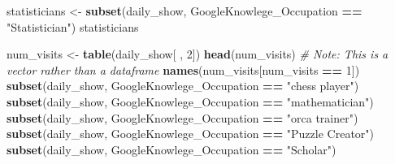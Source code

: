 \documentclass[]{book}
\makeatletter
\newenvironment{Shaded}{\begin{snugshade}}{\end{snugshade}}
\newcommand{\KeywordTok}[1]{\textcolor[rgb]{0.13,0.29,0.53}{\textbf{#1}}}
\newcommand{\DataTypeTok}[1]{\textcolor[rgb]{0.13,0.29,0.53}{#1}}
\newcommand{\DecValTok}[1]{\textcolor[rgb]{0.00,0.00,0.81}{#1}}
\newcommand{\StringTok}[1]{\textcolor[rgb]{0.31,0.60,0.02}{#1}}
\newcommand{\CommentTok}[1]{\textcolor[rgb]{0.56,0.35,0.01}{\textit{#1}}}
\newcommand{\OperatorTok}[1]{\textcolor[rgb]{0.81,0.36,0.00}{\textbf{#1}}}
\newcommand{\NormalTok}[1]{#1}
\newenvironment{kframe}{%
\medskip{}
\setlength{\fboxsep}{.8em}
 \def\at@end@of@kframe{}%
 \ifinner\ifhmode%
  \def\at@end@of@kframe{\end{minipage}}%
  \begin{minipage}{\columnwidth}%
 \fi\fi%
 \def\FrameCommand##1{\hskip\@totalleftmargin \hskip-\fboxsep
 \colorbox{shadecolor}{##1}\hskip-\fboxsep
     \hskip-\linewidth \hskip-\@totalleftmargin \hskip\columnwidth}%
 \MakeFramed {\advance\hsize-\width
   \@totalleftmargin\z@ \linewidth\hsize
   \@setminipage}}%
 {\par\unskip\endMakeFramed%
 \at@end@of@kframe}
\renewenvironment{Shaded}{\begin{kframe}}{\end{kframe}}
\theoremstyle{definition}
\theoremstyle{definition}
\theoremstyle{definition}
\theoremstyle{remark}
\makeatother
\begin{document}
\begin{Shaded}
\end{Shaded}

\begin{Shaded}
\end{Shaded}

\begin{Shaded}
\begin{Highlighting}[]
\NormalTok{statisticians <-}\StringTok{ }\KeywordTok{subset}\NormalTok{(daily_show,}
\NormalTok{                        GoogleKnowlege_Occupation }\OperatorTok{==}\StringTok{ "Statistician"}\NormalTok{)}
\NormalTok{statisticians}
\end{Highlighting}
\end{Shaded}

\begin{Shaded}
\begin{Highlighting}[]
\NormalTok{num_visits <-}\StringTok{ }\KeywordTok{table}\NormalTok{(daily_show[ , }\DecValTok{2}\NormalTok{])}
\KeywordTok{head}\NormalTok{(num_visits) }\CommentTok{# Note: This is a vector rather than a dataframe}
\KeywordTok{names}\NormalTok{(num_visits[num_visits }\OperatorTok{==}\StringTok{ }\DecValTok{1}\NormalTok{])}
\KeywordTok{subset}\NormalTok{(daily_show, GoogleKnowlege_Occupation }\OperatorTok{==}\StringTok{ "chess player"}\NormalTok{)}
\KeywordTok{subset}\NormalTok{(daily_show, GoogleKnowlege_Occupation }\OperatorTok{==}\StringTok{ "mathematician"}\NormalTok{)}
\KeywordTok{subset}\NormalTok{(daily_show, GoogleKnowlege_Occupation }\OperatorTok{==}\StringTok{ "orca trainer"}\NormalTok{)}
\KeywordTok{subset}\NormalTok{(daily_show, GoogleKnowlege_Occupation }\OperatorTok{==}\StringTok{ "Puzzle Creator"}\NormalTok{)}
\KeywordTok{subset}\NormalTok{(daily_show, GoogleKnowlege_Occupation }\OperatorTok{==}\StringTok{ "Scholar"}\NormalTok{)}
\end{Highlighting}
\end{Shaded}
\end{document}
